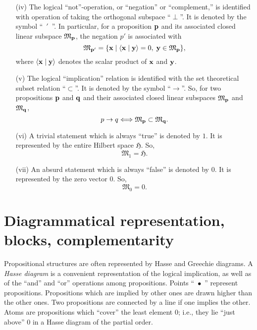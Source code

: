 {\begin{itemize}
Notice that
a vector of Hilbert space may be an element of
$
{\mathfrak M}_{{{\bf p}}} \oplus
{\mathfrak M}_{{{\bf q}}}
$
without being an element of either
$
{\mathfrak M}_{{{\bf p}}} $ or
${\mathfrak M}_{{{\bf q}}}
$, since
$
{\mathfrak M}_{{{\bf p}}} \oplus
{\mathfrak M}_{{{\bf q}}}
$
includes all the vectors in
$
{\mathfrak M}_{{{\bf p}}} \cup
{\mathfrak M}_{{{\bf q}}}
$, as well as all of their linear combinations (superpositions) and
their limit vectors.


\item[(iv)]
The logical {``not''}-operation, or ``negation'' or ``complement,''
is
identified with operation of taking the orthogonal subspace ``$\perp$''.
It is denoted by the symbol ``~$'$~''.
In particular, for a
proposition ${{\bf p}}$ and its associated closed linear
subspace
${\mathfrak M}_{{\bf p}}$, the negation $p'$ is associated with
$$
{\mathfrak M}_{{{\bf p}}'} =
 \{{{\bf x}} \mid \langle {{\bf x}}\mid {{\bf y}}\rangle =0,\; {{\bf y}}\in
{\mathfrak M}_{{\bf p}}
\} ,$$
where $\langle {{\bf x}}\mid {{\bf y}}\rangle$ denotes the scalar product of ${{\bf x}}$ and ${{\bf y}}$.

\item[(v)]
The logical {``implication''} relation is identified with the set
theoretical subset relation ``$\subset$''.
It is denoted by the symbol ``$\rightarrow$''.
So, for two
propositions ${{\bf p}}$ and ${{\bf q}}$ and their associated closed linear
subspaces
${\mathfrak M}_{{\bf p}}$ and
${\mathfrak M}_{{\bf q}}$,
$$
{p\rightarrow q} \Longleftrightarrow
{\mathfrak M}_{{{\bf p}}} \subset
{\mathfrak M}_{{{\bf q}}}.$$

\item[(vi)]
A trivial statement which is always {``true''} is denoted by $1$.
It is represented by the entire Hilbert space $\mathfrak H$.
So, $${\mathfrak M}_1={\mathfrak H}.$$

\item[(vii)]
An absurd statement which is always {``false''} is denoted by $0$.
It is represented by the zero vector $0$.
So, $${\mathfrak M}_0= 0.$$
\end{itemize}



\section{Diagrammatical representation, blocks, complementarity}

Propositional structures are often represented by
Hasse and Greechie diagrams.
A {\em Hasse diagram} is a convenient representation of the
logical implication,
as well as of the {``and''} and {``or''}
operations
among propositions.
 Points
``~$\bullet$~'' represent propositions. Propositions
which are implied by other ones are drawn higher than the other ones.
Two propositions are connected by a line if one implies the other.
Atoms are propositions which ``cover'' the least element $0$; i.e.,
they lie ``just above'' $0$ in a Hasse diagram of the partial order.



}
